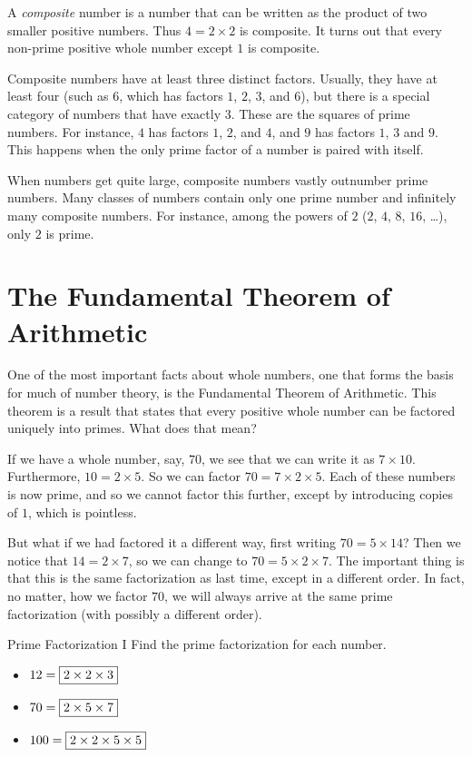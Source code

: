 \documentclass[a4paper,10pt]{report}
\begin{document}
A \emph{composite} number is a number that can be written as the product of two
smaller positive numbers. Thus $4=2\times2$ is composite. It turns out that
every non-prime positive whole number except $1$ is composite.

Composite numbers have at least three distinct factors. Usually, they have at
least four (such as $6$, which has factors $1$, $2$, $3$, and $6$), but there is
a special category of numbers that have exactly $3$. These are the squares of
prime numbers. For instance, $4$ has factors $1$, $2$, and $4$, and $9$ has
factors $1$, $3$ and $9$. This happens when the only prime factor of a number is
paired with itself.

When numbers get quite large, composite numbers vastly outnumber prime numbers.
Many classes of numbers contain only one prime number and infinitely many
composite numbers. For instance, among the powers of $2$ ($2$, $4$, $8$, $16$,
\dots), only $2$ is prime.

\section{The Fundamental Theorem of Arithmetic}

One of the most important facts about whole numbers, one that forms the basis
for much of number theory, is the Fundamental Theorem of Arithmetic. This
theorem is a result that states that every positive whole number can be factored
uniquely into primes. What does that mean?

If we have a whole number, say, $70$, we see that we can write it as
$7\times10$. Furthermore, $10=2\times5$. So we can factor $70=7\times2\times5$.
Each of these numbers is now prime, and so we cannot factor this further, except
by introducing copies of $1$, which is pointless.

But what if we had factored it a different way, first writing $70=5\times14$?
Then we notice that $14=2\times7$, so we can change to $70=5\times2\times7$. The
important thing is that this is the same factorization as last time, except in a
different order. In fact, no matter, how we factor $70$, we will always arrive
at the same prime factorization (with possibly a different order).

\begin{problem}{Prime Factorization I}
 Find the prime factorization for each number.

 \begin{itemize}
  \item $12 = \Ans{2\times2\times3}$
  \item $70 = \Ans{2\times5\times7}$
  \item $100 = \Ans{2\times2\times5\times5}$
 \end{itemize}
\end{problem}
\end{document}
